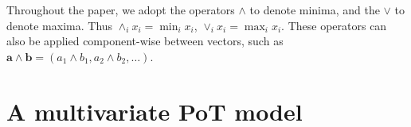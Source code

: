 Throughout the paper, we adopt the operators $\wedge$ to denote minima, and the $\vee$
  to denote maxima.  Thus $\wedge_i x_i = \min_i x_i$, $\vee_i x_i = \max_i x_i$.  These operators can
  also be applied component-wise between vectors, such as $\bm{a}\wedge\bm{b} = (a_1\wedge b_1, a_2\wedge b_2,\ldots)$.
  
\section{A multivariate PoT model}
